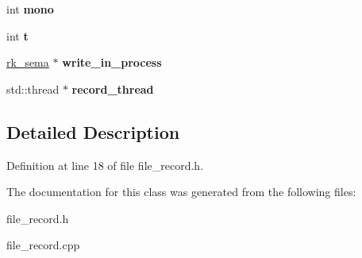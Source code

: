 \begin{DoxyCompactItemize}
int {\bfseries mono}
\item 
\mbox{\label{classfile__record_a0bdcb0ee5740cb1cad3e85ec72d945ef}} 
int {\bfseries t}
\item 
\mbox{\label{classfile__record_a6f56fb00f4c4e0cd497168685c1e7064}} 
\hyperlink{structrk__sema}{rk\+\_\+sema} $\ast$ {\bfseries write\+\_\+in\+\_\+process}
\item 
\mbox{\label{classfile__record_ab8e447e9e889f3d47f946c2a83928cfa}} 
std\+::thread $\ast$ {\bfseries record\+\_\+thread}
\end{DoxyCompactItemize}


\subsection{Detailed Description}


Definition at line 18 of file file\+\_\+record.\+h.



The documentation for this class was generated from the following files\+:\begin{DoxyCompactItemize}
\item 
file\+\_\+record.\+h\item 
file\+\_\+record.\+cpp\end{DoxyCompactItemize}
